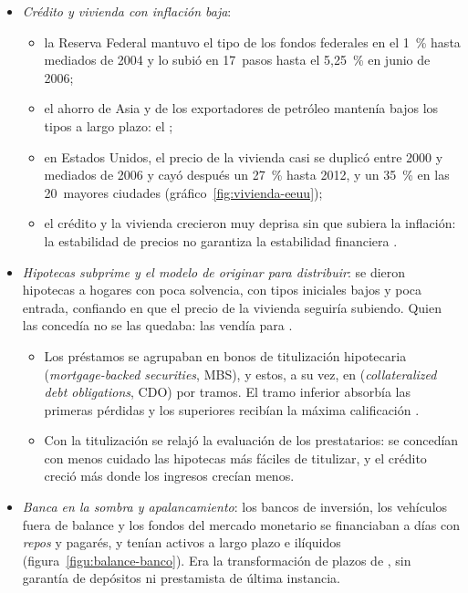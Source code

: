 \documentclass[11pt]{article}
\begin{document}
\begin{itemize}
\item \emph{Crédito y vivienda con inflación baja}:
  \begin{itemize}
  \item la Reserva Federal mantuvo el tipo de los fondos federales en el 1~\% hasta mediados de 2004 y lo subió en 17~pasos hasta el 5,25~\% en junio de 2006\nocite{FRED2026ObjetivoFed};
  \item el ahorro de Asia y de los exportadores de petróleo mantenía bajos los tipos a largo plazo: el \nocite{Bernanke2005Saving};
  \item en Estados Unidos, el precio de la vivienda casi se duplicó entre 2000 y mediados de 2006 y cayó después un 27~\% hasta 2012, y un 35~\% en las 20~mayores ciudades\nocite{FRED2026CaseShiller} (gráfico~\ref{fig:vivienda-eeuu});
  \item el crédito y la vivienda crecieron muy deprisa sin que subiera la inflación: la estabilidad de precios no garantiza la estabilidad financiera .
  \end{itemize}
\item \emph{Hipotecas \emph{subprime} y el modelo de originar para distribuir}: se dieron hipotecas a hogares con poca solvencia, con tipos iniciales bajos y poca entrada, confiando en que el precio de la vivienda seguiría subiendo. Quien las concedía no se las quedaba: las vendía para .
  \begin{itemize}
  \item Los préstamos se agrupaban en bonos de titulización hipotecaria (\emph{mortgage-backed securities}, MBS), y estos, a su vez, en  (\emph{collateralized debt obligations}, CDO) por tramos. El tramo inferior absorbía las primeras pérdidas y los superiores recibían la máxima calificación .
  \item Con la titulización se relajó la evaluación de los prestatarios: se concedían con menos cuidado las hipotecas más fáciles de titulizar\nocite{KeysMukherjeeSeruVig2010}, y el crédito creció más donde los ingresos crecían menos\nocite{MianSufi2009}.
  \end{itemize}
\item \emph{Banca en la sombra y apalancamiento}: los bancos de inversión, los vehículos fuera de balance y los fondos del mercado monetario se financiaban a días con \emph{repos} y pagarés, y tenían activos a largo plazo e ilíquidos (figura~\ref{figu:balance-banco}). Era la transformación de plazos de \textcite{DiamondDybvig1983Bank}, sin garantía de depósitos ni prestamista de última instancia\nocite{Brunnermeier2009Deciphering,GortonMetrick2012Securitized}.

\end{itemize}
\end{document}
